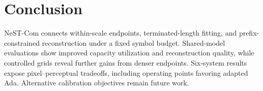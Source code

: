 \section{Conclusion}
NeST-Com connects within-scale endpoints, terminated-length fitting, and prefix-constrained reconstruction under a fixed symbol budget. Shared-model evaluations show improved capacity utilization and reconstruction quality, while controlled grids reveal further gains from denser endpoints. Six-system results expose pixel--perceptual tradeoffs, including operating points favoring adapted Ada. Alternative calibration objectives remain future work.
